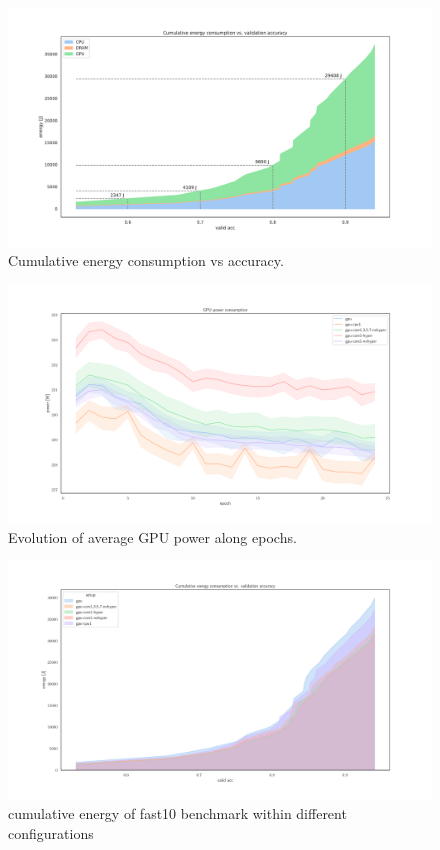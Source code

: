 \begin{figure}
    \centering
    \includegraphics[width=\linewidth]{imgs/cumulative_energy_vs_accuracy}
    \caption{Cumulative energy consumption vs accuracy.}
    \label{fig:cum_energy_vs_accuracy}
\end{figure}
\begin{figure}
    \centering
    \includegraphics[width=\linewidth]{imgs/power_gpu_baedonepoche}
    \caption{Evolution of average GPU power along epochs.}
    \label{fig:p2}
\end{figure}
\begin{figure}
    \centering
    \includegraphics[width=\linewidth]{imgs/cumulative_energy_fast10}
    \caption{cumulative energy of fast10 benchmark within different configurations }
    \label{fig:p2}
\end{figure}


